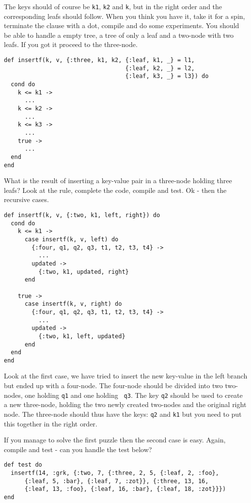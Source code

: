 \documentclass[a4paper,11pt]{article}
\begin{document}
The keys should of course be {\tt k1}, {\tt k2} and {\tt k}, but in
the right order and the corresponding leafs should follow. When you
think you have it, take it for a spin, terminate the clause with a dot,
compile and do some experiments. You should be able to handle a empty
tree, a tree of only a leaf and a two-node with two leafs. If you got
it proceed to the three-node.

\begin{verbatim}
def insertf(k, v, {:three, k1, k2, {:leaf, k1, _} = l1,
                                   {:leaf, k2, _} = l2,
                                   {:leaf, k3, _} = l3}) do
  cond do
    k <= k1 ->
      ...
    k <= k2 ->
      ...
    k <= k3 ->
      ...
    true ->
      ...
  end
end
\end{verbatim}


What is the result of inserting a key-value pair in a three-node
holding three leafs? Look at the rule, complete the code, compile and
test. Ok - then the recursive cases.

\begin{verbatim}
def insertf(k, v, {:two, k1, left, right}) do
  cond do
    k <= k1 ->
      case insertf(k, v, left) do
        {:four, q1, q2, q3, t1, t2, t3, t4} ->
          ...
        updated ->
          {:two, k1, updated, right}
      end

    true ->
      case insertf(k, v, right) do
        {:four, q1, q2, q3, t1, t2, t3, t4} ->
          ...
        updated ->
          {:two, k1, left, updated}
      end
  end
end
\end{verbatim}

Look at the first case, we have tried to insert the new key-value in
the left branch but ended up with a four-node. The four-node should be
divided into two two-nodes, one holding {\tt q1} and one holding {\tt
  q3}. The key {\tt q2} should be used to create a new three-node,
holding the two newly created two-nodes and the original right
node. The three-node should thus have the keys: {\tt q2} and {\tt k1} but
you need to put this together in the right order.

If you manage to solve the first puzzle then the second case is
easy. Again, compile and test - can you handle the test below?

\begin{verbatim}
def test do
  insertf(14, :grk, {:two, 7, {:three, 2, 5, {:leaf, 2, :foo},
      {:leaf, 5, :bar}, {:leaf, 7, :zot}}, {:three, 13, 16,
      {:leaf, 13, :foo}, {:leaf, 16, :bar}, {:leaf, 18, :zot}}})
end
\end{verbatim}
\end{document}

